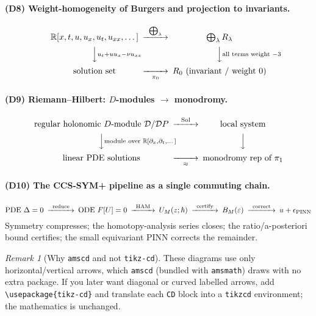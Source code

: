 \documentclass[11pt]{article}
\theoremstyle{definition}
\theoremstyle{remark}
\newtheorem{remark}{Remark}[section]
\newcommand{\R}{\mathbb{R}}
\newcommand{\Sol}{\operatorname{Sol}}
\begin{document}
\paragraph{(D8) Weight-homogeneity of Burgers and projection to invariants.}
\[
\begin{CD}
\R[x,t,u,u_x,u_t,u_{xx},\dots] @>{\ \bigoplus_\lambda\ }>> \bigoplus_\lambda R_\lambda\\
@VV{u_t+uu_x-\nu u_{xx}}V @VV{\text{all terms weight }-3}V\\
\text{solution set} @>>{\ \pi_0\ }> R_0\ \text{(invariant / weight }0)
\end{CD}
\]

\paragraph{(D9) Riemann--Hilbert: $D$-modules $\to$ monodromy.}
\[
\begin{CD}
\text{regular holonomic }D\text{-module }\mathcal{D}/\mathcal{D}P @>{\ \Sol\ }>> \text{local system}\\
@VV{\text{module over }\R[\partial_x,\partial_t,\dots]}V @VV{}V\\
\text{linear PDE solutions} @>>{\ \approx\ }> \text{monodromy rep of }\pi_1
\end{CD}
\]

\paragraph{(D10) The CCS-SYM+ pipeline as a single commuting chain.}
\[
\begin{CD}
\text{PDE }\Delta=0 @>{\ \text{reduce}\ }>> \text{ODE }F[U]=0 @>{\ \text{HAM}\ }>> U_M(z;\hbar)
@>{\ \text{certify}\ }>> B_M(\varepsilon) @>{\ \text{correct}\ }>> u+\epsilon_{\mathrm{PINN}}
\end{CD}
\]
Symmetry compresses; the homotopy-analysis series closes; the ratio/a-posteriori bound certifies; the
small equivariant PINN corrects the remainder.

\begin{remark}[Why \texttt{amscd} and not \texttt{tikz-cd}]
These diagrams use only horizontal/vertical arrows, which \texttt{amscd} (bundled with
\texttt{amsmath}) draws with no extra package. If you later want diagonal or curved labelled arrows,
add \texttt{\textbackslash usepackage\{tikz-cd\}} and translate each \texttt{CD} block into a
\texttt{tikzcd} environment; the mathematics is unchanged.
\end{remark}
\end{document}
